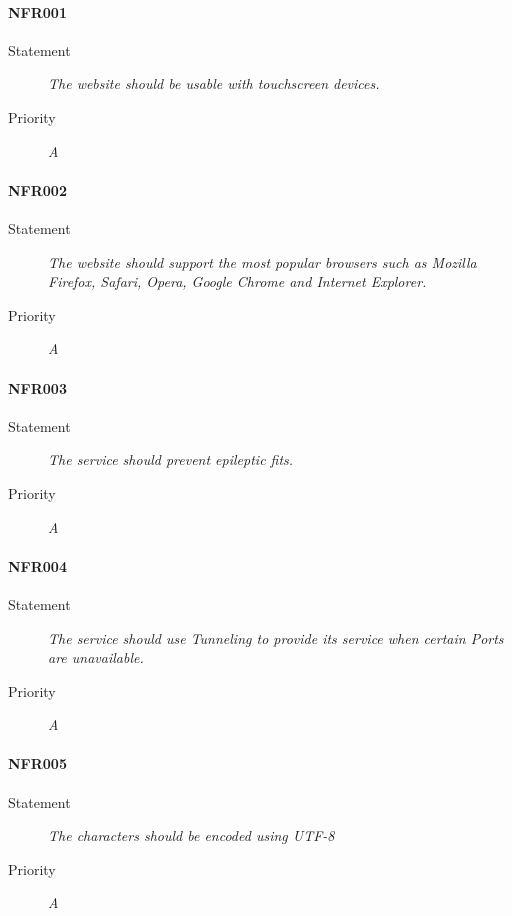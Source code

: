 \paragraph{NFR001}
\begin{description}
  \item [Statement] 
    \textit{The website should be usable with touchscreen devices.}
  \item [Priority] \textit{A}
\end{description}

\paragraph{NFR002}
\begin{description}
  \item [Statement] 
    \textit{The website should support the most popular browsers such as Mozilla Firefox, Safari, Opera, Google Chrome and Internet Explorer.}
  \item [Priority] \textit{A}
\end{description}

\paragraph{NFR003}
\begin{description}
  \item [Statement] 
    \textit{The service should prevent epileptic fits.}
  \item [Priority] \textit{A}
\end{description}

\paragraph{NFR004}
\begin{description}
  \item [Statement] 
    \textit{The service should use \gls{Tunneling} to provide its service when certain \gls{Ports} are unavailable.}
  \item [Priority] \textit{A}
\end{description}

\paragraph{NFR005}
\begin{description}
  \item [Statement]
    \textit{The characters should be encoded using \gls{UTF-8} }
  \item [Priority] \textit{A}
\end{description}

